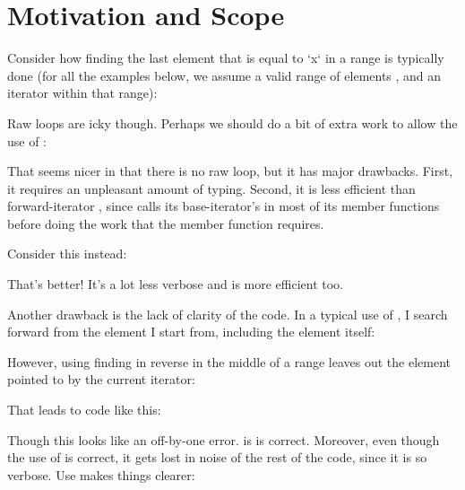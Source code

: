 \section{Motivation and Scope}

Consider how finding the last element that is equal to `x` in a range is
typically done (for all the examples below, we assume a valid range of
elements \code{[first, last)}, and an iterator  within that range):



Raw loops are icky though.  Perhaps we should do a bit of extra work to allow
the use of :



That seems nicer in that there is no raw loop, but it has major drawbacks.
First, it requires an unpleasant amount of typing.  Second, it is less
efficient than forward-iterator  , since 
calls its base-iterator's  in most of its member functions
before doing the work that the member function requires.

Consider this instead:



That's better!  It's a lot less verbose and is more efficient too.

Another drawback is the lack of clarity of the 
code.  In a typical use of , I search forward from the element I
start from, including the element itself:



However, using finding in reverse in the middle of a range leaves out the
element pointed to by the current iterator:



That leads to code like this:



Though this looks like an off-by-one error. is is correct.  Moreover, even
though the use of  is correct, it gets lost in noise of the rest
of the code, since it is so verbose.  Use  makes things
clearer:

